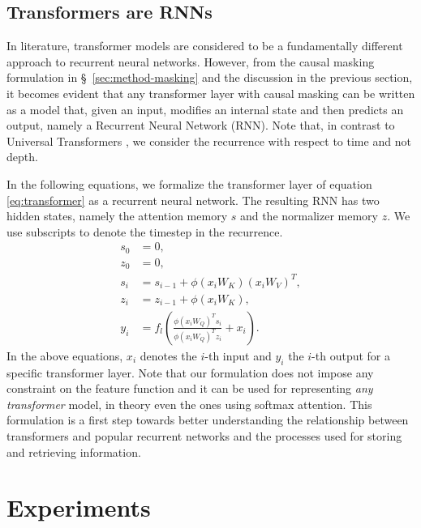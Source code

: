 \documentclass{article}
\newcommand{\fe}[1]{\phi\left(#1\right)}
\begin{document}
\subsection{Transformers are RNNs} \label{sec:method-trnn}

In literature, transformer models are considered to be a fundamentally
different approach to recurrent neural networks. However, from the causal
masking formulation in \S~\ref{sec:method-masking} and the discussion in the
previous section, it becomes evident that any transformer layer with causal
masking can be written as a model that, given an input, modifies an internal
state and then predicts an output, namely a Recurrent Neural Network (RNN). Note that, in contrast to
Universal Transformers \cite{dehghani2018universal}, we consider the recurrence
with respect to time and not depth.

In the following equations, we formalize the transformer layer of equation
\ref{eq:transformer} as a recurrent neural network. The resulting RNN
has two hidden states, namely the attention memory $s$ and the
normalizer memory $z$. We use subscripts to denote the timestep in the
recurrence.
\begin{align}
    s_0 &= 0 \label{eq:trnn-1}, \\
    z_0 &= 0 \label{eq:trnn-2}, \\
    s_i &= s_{i-1} + \fe{x_i W_K} \left(x_i W_V\right)^T, \label{eq:trnn-3} \\
    z_i &= z_{i-1} + \fe{x_i W_K}, \label{eq:trnn-4} \\
    y_i &= f_l\left(\frac{\fe{x_i W_Q}^T s_i}{\fe{x_i W_Q}^T z_i} + x_i\right).
    \label{eq:trnn-5}
\end{align}
In the above equations, $x_i$ denotes the $i$-th input and $y_i$ the $i$-th
output for a specific transformer layer. Note that our formulation does not
impose any constraint on the feature function and it can be used for
representing \emph{any transformer} model, in theory even the ones using softmax
attention. This formulation is a first step towards better understanding the
relationship between transformers and popular recurrent networks
\cite{hochreiter1997long} and the processes used for storing and retrieving
information.

\section{Experiments}
\end{document}
